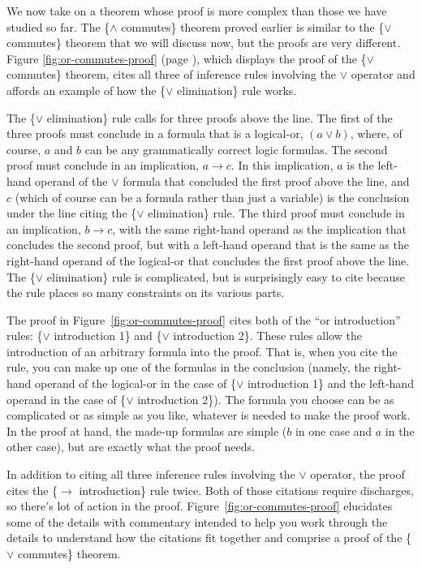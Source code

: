 {We now take on a theorem whose proof is more complex
than those we have studied so far.
The \{$\wedge$ commutes\} theorem proved earlier
is similar to the \{$\vee$ commutes\} theorem
that we will discuss now, but the proofs are very different.
Figure \ref{fig:or-commutes-proof} (page \pageref{fig:or-commutes-proof}),
which displays the proof of the \{$\vee$ commutes\} theorem,
cites all three of inference rules involving the $\vee$ operator
and affords an example of how the \{$\vee$ elimination\} rule works.

The \{$\vee$ elimination\} rule calls for three proofs above the line.
The first of the three proofs must conclude in a formula
that is a logical-or, $(a \vee b)$, where, of course,
$a$ and $b$ can be any grammatically correct logic formulas.
The second proof must conclude in an implication, $a \rightarrow c$.
In this implication, $a$ is the left-hand operand of the $\vee$ formula
that concluded the first proof above the line,
and $c$ (which of course can be a formula rather than just a variable)
is the conclusion under the line citing the \{$\vee$ elimination\} rule.
The third proof must conclude in an implication, $b \rightarrow c$,
with the same right-hand operand as the implication that concludes
the second proof, but with a left-hand operand that is the same
as the right-hand operand of the logical-or that concludes the
first proof above the line.
The \{$\vee$ elimination\} rule is complicated,
but is surprisingly easy to cite
because the rule places so many constraints on its various parts.

The proof in Figure~\ref{fig:or-commutes-proof} cites both of the
``or introduction'' rules:
\{$\vee$ introduction 1\} and \{$\vee$ introduction 2\}.
These rules allow the introduction of an arbitrary formula
into the proof.
That is, when you cite the rule, you can make up one of the
formulas in the conclusion (namely, the right-hand operand of
the logical-or in the case of \{$\vee$ introduction 1\}
and the left-hand operand in the case of \{$\vee$ introduction 2\}).
The formula you choose can be as complicated or as simple as you like,
whatever is needed to make the proof work.
In the proof at hand,
the made-up formulas are simple ($b$ in one case and $a$ in the other case),
but are exactly what the proof needs.

In addition to citing all three inference rules involving the $\vee$ operator,
the proof cites the \{$\rightarrow$ introduction\} rule twice.
Both of those citations require discharges,
so there's lot of action in the proof.
Figure~\ref{fig:or-commutes-proof}
elucidates some of the details with commentary
intended to help you work through the details
to understand how the citations fit together and
comprise a proof of the \{$\vee$ commutes\} theorem.

}
